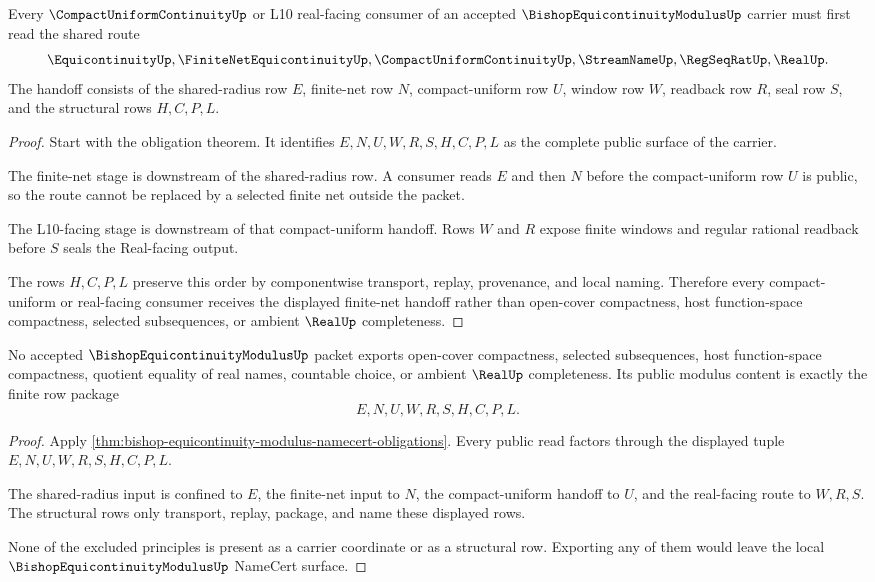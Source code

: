 \begin{theorem}
\label{thm:bishop-equicontinuity-modulus-finite-net-handoff}
Every $\CompactUniformContinuityUp$ or L10 real-facing consumer of an accepted $\BishopEquicontinuityModulusUp$ carrier must first read the shared route
$$
\EquicontinuityUp,\FiniteNetEquicontinuityUp,\CompactUniformContinuityUp,\StreamNameUp,\RegSeqRatUp,\RealUp .
$$
The handoff consists of the shared-radius row $E$, finite-net row $N$, compact-uniform row $U$, window row $W$, readback row $R$, seal row $S$, and the structural rows $H,C,P,L$.
\end{theorem}
\begin{proof}
Start with the obligation theorem. It identifies $E,N,U,W,R,S,H,C,P,L$ as the complete public surface of the carrier.

The finite-net stage is downstream of the shared-radius row. A consumer reads $E$ and then $N$ before the compact-uniform row $U$ is public, so the route cannot be replaced by a selected finite net outside the packet.

The L10-facing stage is downstream of that compact-uniform handoff. Rows $W$ and $R$ expose finite windows and regular rational readback before $S$ seals the Real-facing output.

The rows $H,C,P,L$ preserve this order by componentwise transport, replay, provenance, and local naming. Therefore every compact-uniform or real-facing consumer receives the displayed finite-net handoff rather than open-cover compactness, host function-space compactness, selected subsequences, or ambient $\RealUp$ completeness.
\end{proof}

\begin{theorem}
\label{thm:bishop-equicontinuity-modulus-nonescape}
No accepted $\BishopEquicontinuityModulusUp$ packet exports open-cover compactness, selected subsequences, host function-space compactness, quotient equality of real names, countable choice, or ambient $\RealUp$ completeness. Its public modulus content is exactly the finite row package
$$
E,N,U,W,R,S,H,C,P,L .
$$
\end{theorem}
\begin{proof}
Apply \autoref{thm:bishop-equicontinuity-modulus-namecert-obligations}. Every public read factors through the displayed tuple $E,N,U,W,R,S,H,C,P,L$.

The shared-radius input is confined to $E$, the finite-net input to $N$, the compact-uniform handoff to $U$, and the real-facing route to $W,R,S$. The structural rows only transport, replay, package, and name these displayed rows.

None of the excluded principles is present as a carrier coordinate or as a structural row. Exporting any of them would leave the local $\BishopEquicontinuityModulusUp$ NameCert surface.
\end{proof}

